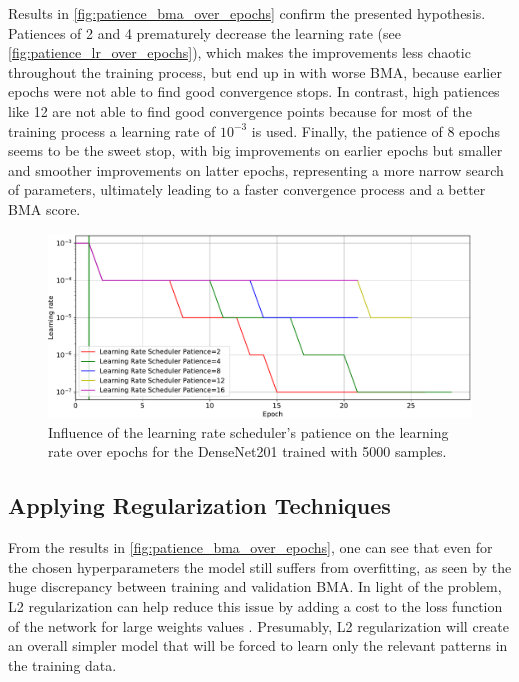     Results in \autoref{fig:patience_bma_over_epochs} confirm the presented hypothesis. Patiences of 2 and 4 prematurely decrease the learning rate (see \autoref{fig:patience_lr_over_epochs}), which makes the improvements less chaotic throughout the training process, but end up in with worse \ac{BMA}, because earlier epochs were not able to find good convergence stops. In contrast, high patiences like 12 are not able to find good convergence points because for most of the training process a learning rate of $10^{-3}$ is used. Finally, the patience of 8 epochs seems to be the sweet stop, with big improvements on earlier epochs but smaller and smoother improvements on latter epochs, representing a more narrow search of parameters, ultimately leading to a faster convergence process and a better \ac{BMA} score.
    
    \begin{figure}[ht]
        \centering
        \includegraphics[width=\textwidth]{figs/densenet201_patience_lr_over_epochs.pdf}
        \caption{Influence of the learning rate scheduler's patience on the learning rate over epochs for the DenseNet201 trained with 5000 samples.}
        \label{fig:patience_lr_over_epochs}
    \end{figure}
    
    \subsection{Applying Regularization Techniques}
    From the results in \autoref{fig:patience_bma_over_epochs}, one can see that even for the chosen hyperparameters the model still suffers from overfitting, as seen by the huge discrepancy between training and validation \ac{BMA}. In light of the problem, L2 regularization can help reduce this issue by adding a cost to the loss function of the network for large weights values \cite{Ng}. Presumably, L2 regularization will create an overall simpler model that will be forced to learn only the relevant patterns in the training data.\par
    
